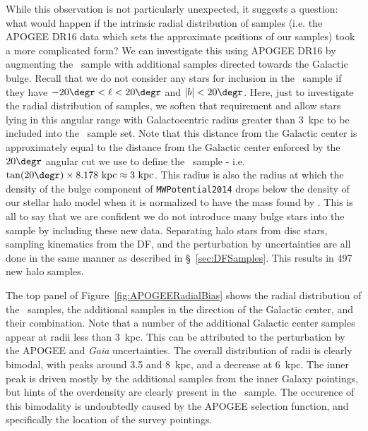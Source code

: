 While this observation is not particularly unexpected, it suggests a question: what would happen if the intrinsic radial distribution of samples (i.e. the APOGEE DR16 data which sets the approximate positions of our samples) took a more complicated form? We can investigate this using APOGEE DR16 by augmenting the \survey\ sample with additional samples directed towards the Galactic bulge. Recall that we do not consider any stars for inclusion in the \survey\ sample if they have $-20\degr < \ell < 20\degr$ and $|b| < 20\degr$. Here, just to investigate the radial distribution of samples, we soften that requirement and allow stars lying in this angular range with Galactocentric radius greater than 3~kpc to be included into the \survey\ sample set. Note that this distance from the Galactic center is approximately equal to the distance from the Galactic center enforced by the $20\degr$ angular cut we use to define the \survey\ sample - i.e. $\tan(20\degr) \times 8.178~\mathrm{kpc} \approx 3~\mathrm{kpc}$. This radius is also the radius at which the density of the bulge component of \texttt{MWPotential2014} drops below the density of our stellar halo model when it is normalized to have the mass found by \citet{mackereth20}. This is all to say that we are confident we do not introduce many bulge stars into the sample by including these new data. Separating halo stars from disc stars, sampling kinematics from the DF, and the perturbation by uncertainties are all done in the same manner as described in \S~\ref{sec:DFSamples}. This results in 497 new halo samples.

The top panel of Figure~\ref{fig:APOGEERadialBias} shows the radial distribution of the \survey\ samples, the additional samples in the direction of the Galactic center, and their combination. Note that a number of the additional Galactic center samples appear at radii less than 3~kpc. This can be attributed to the perturbation by the APOGEE and \textit{Gaia} uncertainties. The overall distribution of radii is clearly bimodal, with peaks around 3.5 and 8~kpc, and a decrease at 6~kpc. The inner peak is driven mostly by the additional samples from the inner Galaxy pointings, but hints of the overdensity are clearly present in the \survey\ sample. The occurence of this bimodality is undoubtedly caused by the APOGEE selection function, and specifically the location of the survey pointings.

